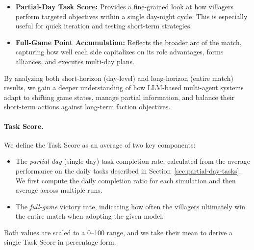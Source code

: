 \begin{itemize}
    \item \textbf{Partial-Day Task Score:} Provides a fine-grained look at how villagers perform targeted objectives within a single day-night cycle. This is especially useful for quick iteration and testing short-term strategies.
    \item \textbf{Full-Game Point Accumulation:} Reflects the broader arc of the match, capturing how well each side capitalizes on its role advantages, forms alliances, and executes multi-day plans.
\end{itemize}

By analyzing both short-horizon (day-level) and long-horizon (entire match) results, we gain a deeper understanding of how LLM-based multi-agent systems adapt to shifting game states, manage partial information, and balance their short-term actions against long-term faction objectives.

\paragraph{Task Score.}
We define the Task Score as an average of two key components:
\begin{itemize}
    \item The \emph{partial-day} (single-day) task completion rate, calculated from the average performance on the daily tasks described in Section~\ref{sec:partial-day-tasks}. We first compute the daily completion ratio for each simulation and then average across multiple runs.
    \item The \emph{full-game} victory rate, indicating how often the villagers ultimately win the entire match when adopting the given model. 
\end{itemize}
Both values are scaled to a 0--100 range, and we take their mean to derive a single Task Score in percentage form.

